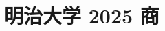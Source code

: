 \documentclass[../../uem_mat_mei_q.tex]{subfiles}
\begin{document}
    \section{明治大学 2025 商}
    \subsection{　}
    
    \newpage
    \subsection{　}
    
    \newpage
    \subsection{　}
    
\end{document}
